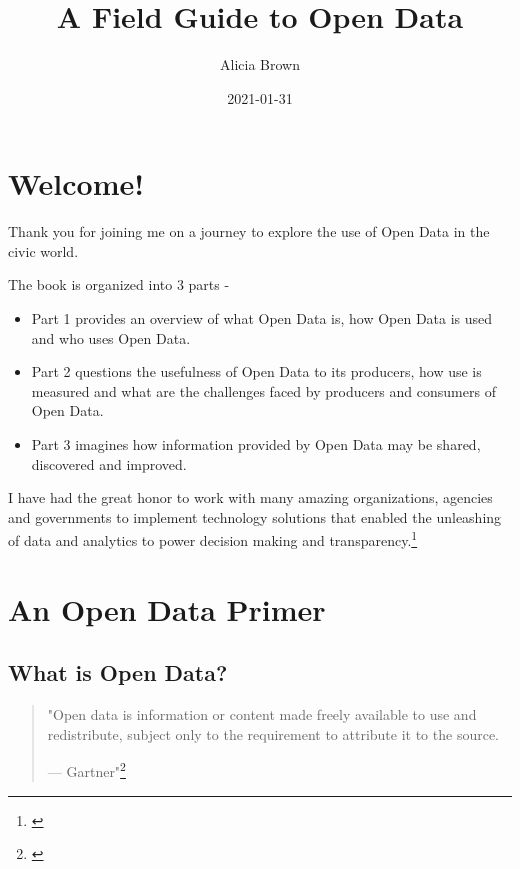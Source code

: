 \documentclass[
]{book}
\title{A Field Guide to Open Data}
\author{Alicia Brown}
\date{2021-01-31}
\providecommand{\tightlist}{%
  \setlength{\itemsep}{0pt}\setlength{\parskip}{0pt}}
\begin{document}
\maketitle

{
\setcounter{tocdepth}{1}
\tableofcontents
}
\hypertarget{welcome}{%
\chapter{Welcome!}\label{welcome}}

Thank you for joining me on a journey to explore the use of Open Data in the civic world.

The book is organized into 3 parts -

\begin{itemize}
\tightlist
\item
  Part 1 provides an overview of what Open Data is, how Open Data is used and who uses Open Data.
\item
  Part 2 questions the usefulness of Open Data to its producers, how use is measured and what are the challenges faced by producers and consumers of Open Data.
\item
  Part 3 imagines how information provided by Open Data may be shared, discovered and improved.
\end{itemize}

I have had the great honor to work with many amazing organizations, agencies and governments to implement technology solutions that enabled the unleashing of data and analytics to power decision making and transparency.\footnote{\citet{blog5years}}

\hypertarget{overview}{%
\chapter{An Open Data Primer}\label{overview}}

\hypertarget{what-is-open-data}{%
\section{What is Open Data?}\label{what-is-open-data}}

\begin{quote}
"Open data is information or content made freely available to use and redistribute, subject only to the requirement to attribute it to the source.

--- Gartner"\footnote{\citet{gartner_opendata_def}}
\end{quote}
\end{document}
